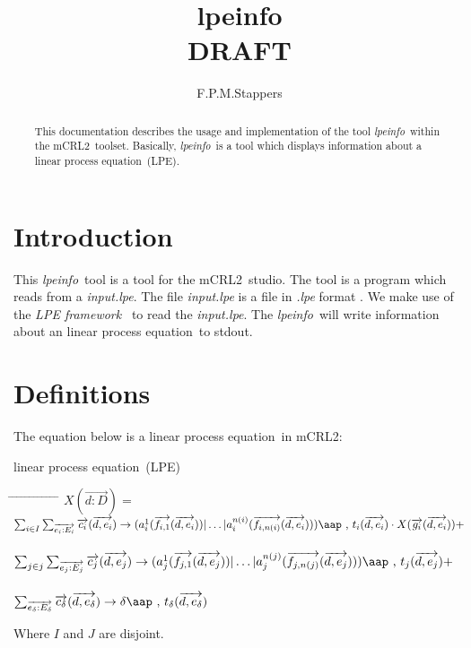 \documentclass[a4paper,10pt]{article}
\title{lpeinfo\\DRAFT}
\author{F.P.M.Stappers}
\theoremstyle{plain}
\theoremstyle{definition}
\newcommand{\mcrl}{mCRL2}
\newcommand{\lpe}{linear process equation}
\newcommand{\tool}{\textit{lpeinfo}}
\newcommand{\ti}{\textit}
\newcommand{\ovr}{\overrightarrow}
\newcommand{\framework}{\textit{LPE framework} \cite{LPEframework}}
\newcommand{\tab}{\hspace*{5.mm} \= \hspace*{5.mm} \= \hspace*{5.mm} \= \hspace*{5.mm} \= \hspace*{5.mm} \= \hspace*{5.mm}  \= \hspace*{5.mm}  \= \hspace*{5.mm}  \= \hspace*{5.mm} \= \hspace*{5.mm} \= \hspace*{5.mm}  \= \hspace*{5.mm}  \= \hspace*{5.mm}\kill}
\newcommand{\at}[1]{\mbox{\aap ,} #1}
\begin{document}
\maketitle

\begin{abstract}
This documentation describes the usage and implementation of the tool \tool\ within the \mcrl\ toolset.
Basically, \tool\ is a tool which displays information about a \lpe\ (LPE).
\end{abstract}

\section{Introduction}
This \tool\ tool is a tool for the \mcrl\ studio. The tool is a program which reads from a \ti{input.lpe}. The file \ti{input.lpe} is
a file in \ti{.lpe} format \cite{LPEformat}. We make use of the
\framework\ to read the \ti{input.lpe}. The \tool\ will write
information about an \lpe\ to stdout. 
\section{Definitions} \label{sec:def}

The equation below is a \lpe\ in \mcrl : 
\begin{defn}\lpe\ (LPE) \newline
\begin{tabbing}
\tab
$X (\ovr{d: D}) = $ \> \> \> $ \sum_{i \in I} \sum_{\ovr{e_i: E_i}} \ovr{c_i} ( \ovr{d, e_i }) \rightarrow 
(a_i^1 (\ovr{f_{i,1}}(\ovr{d,e_i})) \vert \ldots \vert a_i^{n(i)}(\ovr{f_{i,n(i)}}(\ovr{d,e_i}))) \at \text{ } t_i(\ovr{d,e_i})  \cdot X(\ovr{g_i}(\ovr{d,e_i})) +$ \\ \\
\> \> \> $ \sum_{j \in j} \sum_{\ovr{e_j: E_j}} \ovr{c_j} ( \ovr{d, e_j} ) \rightarrow 
(a_j^1 (\ovr{f_{j,1}}(\ovr{d,e_j})) \vert \ldots \vert a_j^{n(j)}(\ovr{f_{j,n(j)}}(\ovr{d,e_j}))) \at \text{ } t_j(\ovr{d,e_j}) + $ \\ \\
\> \> \> $\sum_{\ovr{e_\delta:E_\delta}} \ovr{c_\delta} ( \ovr{d, e_\delta}) \rightarrow 
\delta \at \text{ } t_\delta(\ovr{d,e_\delta})$ 
\end{tabbing}

Where $I$ and $J$ are disjoint.\\
\end{defn}
\end{document}

